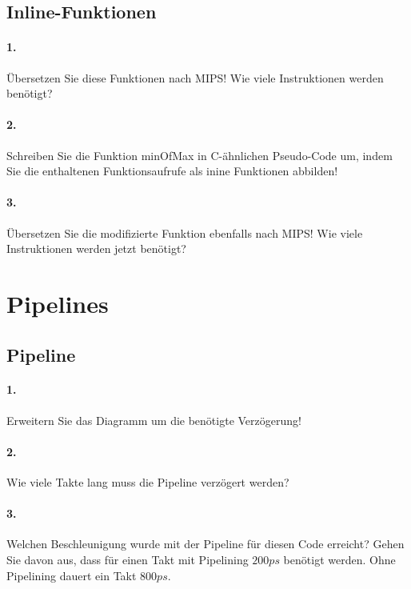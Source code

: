 \documentclass[paper=a4, fontsize=11pt]{scrartcl}
\numberwithin{equation}{section}
\numberwithin{figure}{section}
\numberwithin{table}{section}
\begin{document}
\subsection{Inline-Funktionen}

\paragraph{1.}
Übersetzen Sie diese Funktionen nach MIPS! Wie viele Instruktionen werden benötigt?

\paragraph{2.}
Schreiben Sie die Funktion minOfMax in C-ähnlichen Pseudo-Code um, indem Sie die enthaltenen Funktionsaufrufe als inine Funktionen abbilden!

\paragraph{3.}
Übersetzen Sie die modifizierte Funktion ebenfalls nach MIPS! Wie viele Instruktionen werden jetzt benötigt?

\section{Pipelines}
\subsection{Pipeline}

\paragraph{1.}
Erweitern Sie das Diagramm um die benötigte Verzögerung!

\paragraph{2.}
Wie viele Takte lang muss die Pipeline verzögert werden?

\paragraph{3.}
Welchen Beschleunigung wurde mit der Pipeline für diesen Code erreicht? Gehen Sie davon aus, dass für einen Takt mit Pipelining $200 ps$ benötigt werden. Ohne Pipelining dauert ein Takt $800 ps$.
\end{document}
